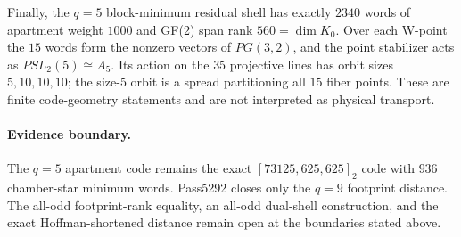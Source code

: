 Finally, the $q=5$ block-minimum residual shell has exactly $2340$ words of apartment weight $1000$ and GF(2) span rank $560=\dim K_0$.  Over each W-point the $15$ words form the nonzero vectors of $PG(3,2)$, and the point stabilizer acts as $PSL_2(5)\cong A_5$.  Its action on the $35$ projective lines has orbit sizes $5,10,10,10$; the size-$5$ orbit is a spread partitioning all $15$ fiber points.  These are finite code-geometry statements and are not interpreted as physical transport.

\paragraph{Evidence boundary.}
The $q=5$ apartment code remains the exact $[73125,625,625]_2$ code with $936$ chamber-star minimum words.  Pass5292 closes only the $q=9$ footprint distance.  The all-odd footprint-rank equality, an all-odd dual-shell construction, and the exact Hoffman-shortened distance remain open at the boundaries stated above.
